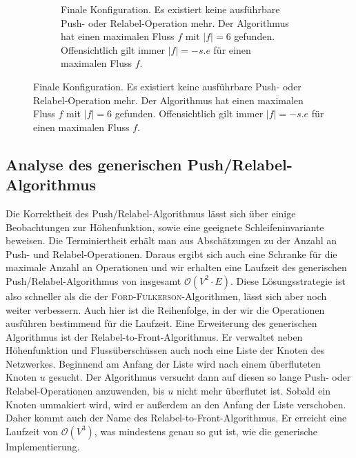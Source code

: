 \documentclass[12pt,a4paper,titlepage,onecolumn,ngerman,bibliography=totocnumbered]{scrartcl}
\theoremstyle{definition}
\theoremstyle{remark}
\newcommand{\ff}{\textsc{Ford-Fulkerson}}
\newcommand{\pr}{Push/Relabel}
\begin{document}
\begin{figure}
\begin{subfigure}{0.95\textwidth}
        \caption{Finale Konfiguration. 
                Es existiert keine ausführbare Push- oder Relabel-Operation mehr. 
                Der Algorithmus hat einen maximalen Fluss $f$ mit $\lvert f\rvert = 6$ gefunden.
                Offensichtlich gilt immer $\lvert f\rvert = - s.e$ für einen maximalen Fluss $f$.} %
	\end{subfigure}
\end{figure}

\subsection{Analyse des generischen \pr -Algorithmus}
Die Korrektheit des \pr -Algorithmus lässt sich über einige Beobachtungen zur Höhenfunktion, sowie eine geeignete Schleifeninvariante beweisen.
Die Terminiertheit erhält man aus Abschätzungen zu der Anzahl an Push- und Relabel-Operationen.
Daraus ergibt sich auch eine Schranke für die maximale Anzahl an Operationen und wir erhalten eine Laufzeit des generischen \pr -Algorithmus von insgesamt $\mathcal{O}(V^2 \cdot E)$.
Diese Lösungsstrategie ist also schneller als die der \ff -Algorithmen, lässt sich aber noch weiter verbessern.
Auch hier ist die Reihenfolge, in der wir die Operationen ausführen bestimmend für die Laufzeit.
Eine Erweiterung des generischen Algorithmus ist der Relabel-to-Front-Algorithmus.
Er verwaltet neben Höhenfunktion und Flussüberschüssen auch noch eine Liste der Knoten des Netzwerkes.
Beginnend am Anfang der Liste wird nach einem überfluteten Knoten $u$ gesucht.
Der Algorithmus versucht dann auf diesen so lange Push- oder Relabel-Operationen anzuwenden, bis $u$ nicht mehr überflutet ist.
Sobald ein Knoten ummakiert wird, wird er außerdem an den Anfang der Liste verschoben.
Daher kommt auch der Name des Relabel-to-Front-Algorithmus.
Er erreicht eine Laufzeit von $\mathcal{O}(V^3)$, was mindestens genau so gut ist, wie die generische Implementierung.
\end{document}
